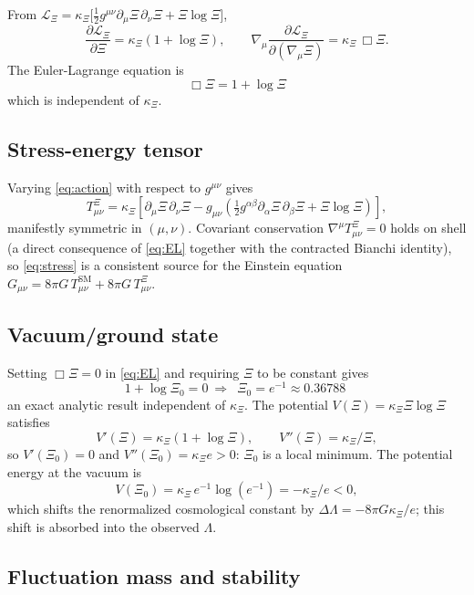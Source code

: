 \documentclass[11pt,reqno]{amsart}
\theoremstyle{plain}
\theoremstyle{definition}
\theoremstyle{remark}
\newcommand{\SM}{\mathrm{SM}}
\begin{document}
From $\mathcal{L}_\Xi=\kappa_\Xi\bigl[\tfrac{1}{2}g^{\mu\nu}\partial_\mu\Xi\,\partial_\nu\Xi+\Xi\log\Xi\bigr]$,
\[
  \frac{\partial\mathcal{L}_\Xi}{\partial\Xi}=\kappa_\Xi(1+\log\Xi),\qquad
  \nabla_\mu\frac{\partial\mathcal{L}_\Xi}{\partial(\nabla_\mu\Xi)}
  =\kappa_\Xi\,\Box\Xi.
\]
The Euler-Lagrange equation is
\begin{equation}\label{eq:EL}
  \boxed{\;\Box\Xi=1+\log\Xi\;}
\end{equation}
which is independent of $\kappa_\Xi$.

\subsection{Stress-energy tensor}

Varying \eqref{eq:action} with respect to $g^{\mu\nu}$ gives
\begin{equation}\label{eq:stress}
  T^{\Xi}_{\mu\nu}=\kappa_\Xi\!\left[\partial_\mu\Xi\,\partial_\nu\Xi
  -g_{\mu\nu}\!\left(\tfrac{1}{2}g^{\alpha\beta}\partial_\alpha\Xi\,\partial_\beta\Xi
  +\Xi\log\Xi\right)\right],
\end{equation}
manifestly symmetric in $(\mu,\nu)$. Covariant conservation
$\nabla^{\mu}T^{\Xi}_{\mu\nu}=0$ holds on shell (a direct consequence of
\eqref{eq:EL} together with the contracted Bianchi identity), so \eqref{eq:stress}
is a consistent source for the Einstein equation
$G_{\mu\nu}=8\pi G\,T^{\SM}_{\mu\nu}+8\pi G\,T^{\Xi}_{\mu\nu}$.

\subsection{Vacuum/ground state}

Setting $\Box\Xi=0$ in \eqref{eq:EL} and requiring $\Xi$ to be constant gives
\begin{equation}\label{eq:vacuum}
  1+\log\Xi_0=0\ \Longrightarrow\ \boxed{\;\Xi_0=e^{-1}\approx 0.36788\;}
\end{equation}
an exact analytic result independent of $\kappa_\Xi$. The potential
$V(\Xi)=\kappa_\Xi\Xi\log\Xi$ satisfies
\[
  V'(\Xi)=\kappa_\Xi(1+\log\Xi),\qquad V''(\Xi)=\kappa_\Xi/\Xi,
\]
so $V'(\Xi_0)=0$ and $V''(\Xi_0)=\kappa_\Xi e>0$: $\Xi_0$ is a local minimum.
The potential energy at the vacuum is
\[
  V(\Xi_0)=\kappa_\Xi\,e^{-1}\log(e^{-1})=-\kappa_\Xi/e<0,
\]
which shifts the renormalized cosmological constant by
$\Delta\Lambda=-8\pi G\kappa_\Xi/e$; this shift is absorbed into the observed
$\Lambda$.

\subsection{Fluctuation mass and stability}
\end{document}
